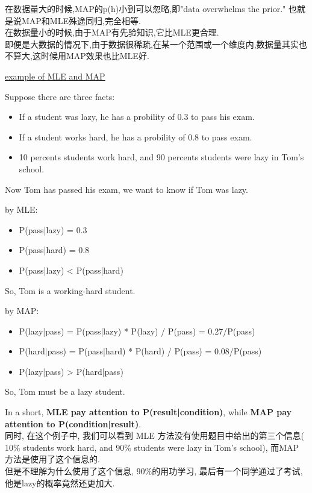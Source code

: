 \documentclass{article}
\begin{document}
在数据量大的时候,MAP的p(h)小到可以忽略,即"data overwhelms the prior." 也就是说MAP和MLE殊途同归,完全相等.\\
在数据量小的时候,由于MAP有先验知识,它比MLE更合理.\\
即便是大数据的情况下,由于数据很稀疏,在某一个范围或一个维度内,数据量其实也不算大,这时候用MAP效果也比MLE好.

\begin{example}
\href{http://jimbozhang.blogspot.com/2008/12/difference-between-map-and-mle.html}{example of MLE and MAP}

Suppose there are three facts:
\begin{itemize}
\item If a student was lazy, he has a probility of 0.3 to pass his exam.
\item If a student works hard, he has a probility of 0.8 to pass exam.
\item 10 percents students work hard, and 90 percents students were lazy in Tom's school.
\end{itemize}
Now Tom has passed his exam, we want to know if Tom was lazy.

by MLE:
\begin{itemize}
\item P(pass|lazy) = 0.3
\item P(pass|hard) = 0.8
\item P(pass|lazy) < P(pass|hard)
\end{itemize}
So, Tom is a working-hard student.

by MAP:
\begin{itemize}
\item P(lazy|pass) = P(pass|lazy) * P(lazy) / P(pass) = 0.27/P(pass) 
\item P(hard|pass) = P(pass|hard) * P(hard) / P(pass) = 0.08/P(pass)
\item P(lazy|pass) > P(hard|pass)
\end{itemize}
So, Tom must be a lazy student.

In a short, \textbf{MLE pay attention to P(result|condition)}, while \textbf{MAP pay attention to P(condition|result)}.\\
同时, 在这个例子中, 我们可以看到 
MLE 方法没有使用题目中给出的第三个信息($10\%$ students work hard, and $90\%$ students were lazy in Tom's school), 
而MAP 方法是使用了这个信息的.\\
但是不理解为什么使用了这个信息, $90\%$的用功学习, 最后有一个同学通过了考试, 他是lazy的概率竟然还更加大.
\end{example}
\end{document}
